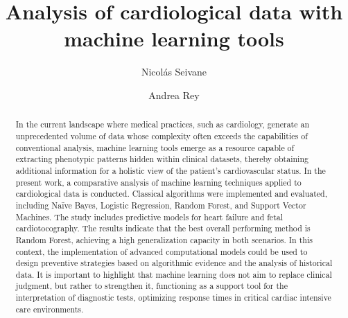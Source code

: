 \documentclass{llncs}
\begin{document}
%
\title{Analysis of cardiological data with machine learning tools}

%
\author{Nicolás Seivane \and
Andrea Rey}
%
%
%
\maketitle              %
%
\begin{abstract}
In the current landscape where medical practices, such as cardiology, generate an unprecedented volume of data whose complexity often exceeds the capabilities of conventional analysis, machine learning tools emerge as a resource capable of extracting phenotypic patterns hidden within clinical datasets, thereby obtaining additional information for a holistic view of the patient's cardiovascular status. 
In the present work, a comparative analysis of machine learning techniques applied to cardiological data is conducted. Classical algorithms were implemented and evaluated, including Naïve Bayes, Logistic Regression, Random Forest, and Support Vector Machines. The study includes predictive models for heart failure and fetal cardiotocography. The results indicate that the best overall performing method is Random Forest, achieving a high generalization capacity in both scenarios.
In this context, the implementation of advanced computational models could be used to design preventive strategies based on algorithmic evidence and the analysis of historical data. It is important to highlight that machine learning does not aim to replace clinical judgment, but rather to strengthen it, functioning as a support tool for the interpretation of diagnostic tests, optimizing response times in critical cardiac intensive care environments.

\end{abstract}
\end{document}
